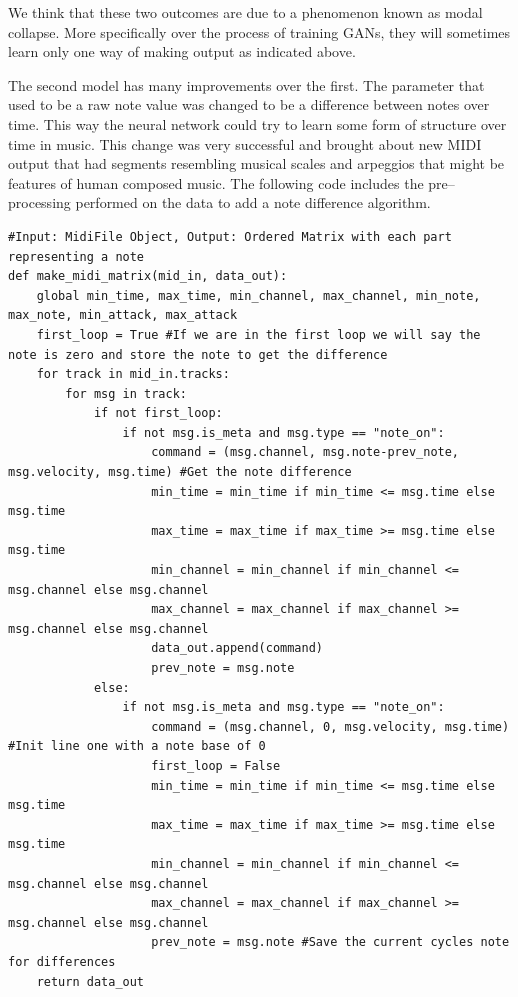 \documentclass[12pt]{amsart}
\theoremstyle{definition}
\theoremstyle{remark}
\begin{document}
We think that these two outcomes are due to a phenomenon known as modal collapse. More specifically over the process
of training GANs, they will sometimes learn only one way of making output as indicated above.

The second model has many improvements over the first. The parameter that used to be a raw note value
was changed to be a difference between notes over time. This way the neural network could try to learn
some form of structure over time in music. This change was very successful and brought about new MIDI
output that had segments resembling musical scales and arpeggios that might be features of human composed music.
The following code includes the pre--processing performed on the data to add a note difference algorithm.
\small{
\begin{lstlisting}
#Input: MidiFile Object, Output: Ordered Matrix with each part representing a note
def make_midi_matrix(mid_in, data_out):
    global min_time, max_time, min_channel, max_channel, min_note, max_note, min_attack, max_attack
    first_loop = True #If we are in the first loop we will say the note is zero and store the note to get the difference 
    for track in mid_in.tracks:
        for msg in track:
            if not first_loop:
                if not msg.is_meta and msg.type == "note_on":
                    command = (msg.channel, msg.note-prev_note, msg.velocity, msg.time) #Get the note difference
                    min_time = min_time if min_time <= msg.time else msg.time
                    max_time = max_time if max_time >= msg.time else msg.time
                    min_channel = min_channel if min_channel <= msg.channel else msg.channel
                    max_channel = max_channel if max_channel >= msg.channel else msg.channel
                    data_out.append(command)
                    prev_note = msg.note
            else:
                if not msg.is_meta and msg.type == "note_on":
                    command = (msg.channel, 0, msg.velocity, msg.time) #Init line one with a note base of 0
                    first_loop = False
                    min_time = min_time if min_time <= msg.time else msg.time
                    max_time = max_time if max_time >= msg.time else msg.time
                    min_channel = min_channel if min_channel <= msg.channel else msg.channel
                    max_channel = max_channel if max_channel >= msg.channel else msg.channel
                    prev_note = msg.note #Save the current cycles note for differences
    return data_out
\end{lstlisting}
}
\end{document}
